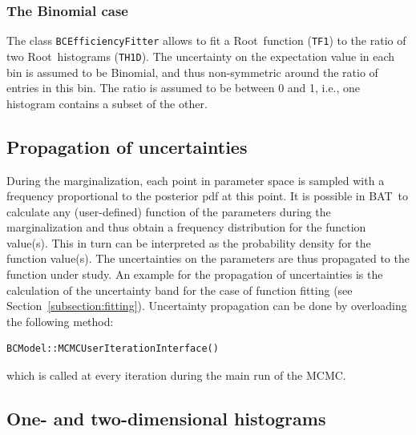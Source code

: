 \documentclass[11pt, a4paper]{article}
\newcommand{\bat}{{\sc BAT}}
\newcommand{\Root}{{\sc Root}}
\begin{document}

\subsubsection{The Binomial case} 

The class \verb|BCEfficiencyFitter| allows to fit a \Root\ function
(\verb|TF1|) to the ratio of two \Root\ histograms (\verb|TH1D|). The
uncertainty on the expectation value in each bin is assumed to be
Binomial, and thus non-symmetric around the ratio of entries in this
bin. The ratio is assumed to be between 0 and 1, i.e., one histogram
contains a subset of the other.



\subsection{Propagation of uncertainties}

During the marginalization, each point in parameter space is sampled
with a frequency proportional to the posterior pdf at this point. It
is possible in \bat\ to calculate any (user-defined) function of the
parameters during the marginalization and thus obtain a frequency
distribution for the function value(s). This in turn can be
interpreted as the probability density for the function value(s). The
uncertainties on the parameters are thus propagated to the function
under study. An example for the propagation of uncertainties is the
calculation of the uncertainty band for the case of function fitting
(see Section~\ref{subsection:fitting}).  Uncertainty propagation can
be done by overloading the following method:
%
\begin{verbatim}
BCModel::MCMCUserIterationInterface() 
\end{verbatim}
%
which is called at every iteration during the main run of the MCMC.


\subsection{One- and two-dimensional histograms} 
\end{document}
